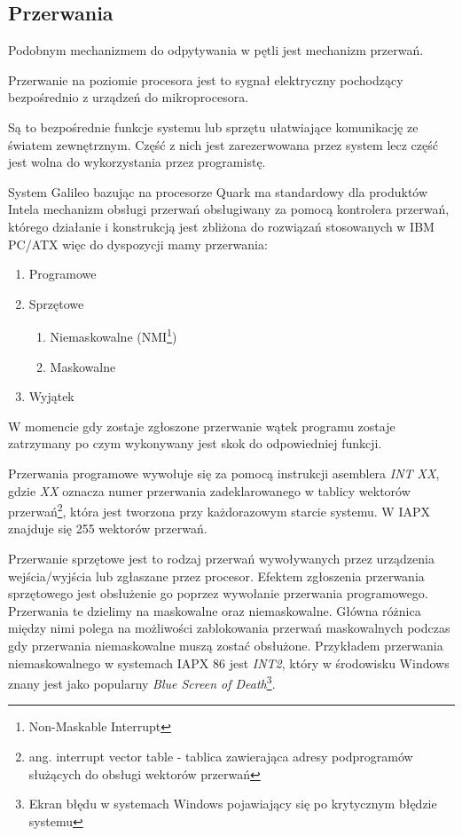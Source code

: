 \documentclass{xmgr}
\begin{document}
\subsection{Przerwania}
Podobnym mechanizmem do odpytywania w pętli jest mechanizm przerwań. 

Przerwanie na poziomie procesora jest to sygnał elektryczny pochodzący bezpośrednio z urządzeń do mikroprocesora.

Są to bezpośrednie funkcje systemu lub sprzętu ułatwiające komunikację ze światem zewnętrznym. Część z nich jest zarezerwowana przez system lecz część jest wolna do wykorzystania przez programistę.

System Galileo bazując na procesorze Quark ma standardowy dla produktów Intela mechanizm obsługi przerwań obsługiwany za pomocą kontrolera przerwań, którego działanie i konstrukcją jest zbliżona do rozwiązań stosowanych w IBM PC/ATX więc do dyspozycji mamy przerwania:
\begin{enumerate}
	\item Programowe
	\item Sprzętowe
	\begin{enumerate}
		\item Niemaskowalne (NMI\footnote{Non-Maskable Interrupt})
		\item Maskowalne
	\end{enumerate}
	\item Wyjątek
\end{enumerate}

W momencie gdy zostaje zgłoszone przerwanie wątek programu zostaje zatrzymany po czym wykonywany jest skok do odpowiedniej funkcji.

Przerwania programowe wywołuje się za pomocą instrukcji asemblera \emph{INT XX}, gdzie \emph{XX} oznacza numer przerwania zadeklarowanego w tablicy wektorów przerwań\footnote{ang. interrupt vector table - tablica zawierająca adresy podprogramów służących do obsługi wektorów przerwań}, która jest tworzona przy każdorazowym starcie systemu. W IAPX znajduje się 255 wektorów przerwań.

Przerwanie sprzętowe jest to rodzaj przerwań wywoływanych przez urządzenia wejścia/wyjścia lub zgłaszane przez procesor. Efektem zgłoszenia przerwania sprzętowego jest obsłużenie go poprzez wywołanie przerwania programowego. Przerwania te dzielimy na maskowalne oraz niemaskowalne. Główna różnica między nimi polega na możliwości zablokowania przerwań maskowalnych podczas gdy przerwania niemaskowalne muszą zostać obsłużone. Przykładem przerwania niemaskowalnego w systemach IAPX 86 jest \emph{INT2}, który w środowisku Windows znany jest jako popularny \emph{Blue Screen of Death}\footnote{Ekran błędu w systemach Windows pojawiający się po krytycznym błędzie systemu}.
\end{document}
